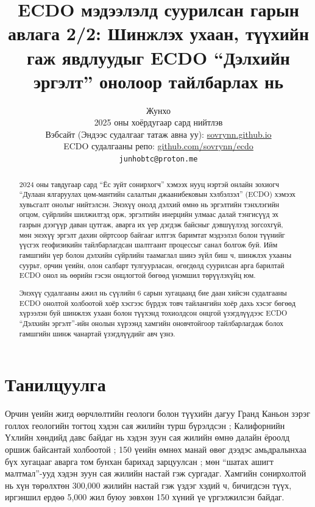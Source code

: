 \documentclass[10pt,twocolumn,letterpaper]{article}
\begin{document}
\title{ECDO мэдээлэлд суурилсан гарын авлага 2/2: Шинжлэх ухаан, түүхийн гаж явдлуудыг ECDO “Дэлхийн эргэлт” онолоор тайлбарлах нь}

\author{Жунхо\\
2025 оны хоёрдугаар сард нийтлэв\\
Вэбсайт (Эндээс судалгааг татаж авна уу): \href{https://sovrynn.github.io}{sovrynn.github.io}\\
ECDO судалгааны репо: \href{https://github.com/sovrynn/ecdo}{github.com/sovrynn/ecdo}\\
{\tt\small junhobtc@proton.me}
}

\maketitle

\begin{abstract}
2024 оны тавдугаар сард “Ёс зүйт сонирхогч” хэмээх нууц нэртэй онлайн зохиогч \cite{0} “Дулаан ялгаруулах цөм-мантийн салалтын джаанибековын хэлбэлзэл” (ECDO) \cite{1} хэмээх хувьсгалт онолыг нийтэлсэн. Энэхүү онолд дэлхий өмнө нь эргэлтийн тэнхлэгийн огцом, сүйрлийн шилжилтэд орж, эргэлтийн инерцийн улмаас далай тэнгисүүд эх газрын дээгүүр даван цутгаж, аварга их үер дэгдэж байсныг дэвшүүлээд зогсохгүй, мөн энэхүү эргэлт дахин ойртсоор байгааг илтгэх баримтат мэдээлэл болон түүнийг үүсгэх геофизикийн тайлбарлагдсан шалтгаант процессыг санал болгож буй. Ийм гамшгийн үер болон дэлхийн сүйрлийн таамаглал шинэ зүйл биш ч, шинжлэх ухааны суурьт, орчин үеийн, олон салбарт тулгуурласан, өгөгдөлд суурилсан арга барилтай ECDO онол нь өөрийн гэсэн онцлогтой бөгөөд үнэмшил төрүүлэхүйц юм.

Энэхүү судалгааны ажил нь сүүлийн 6 сарын хугацаанд бие даан хийсэн судалгааны \cite{2,20} ECDO онолтой холбоотой хоёр хэсгээс бүрдэх товч тайлангийн хоёр дахь хэсэг бөгөөд хүрээлэн буй шинжлэх ухаан болон түүхэнд тохиолдсон онцгой үзэгдлүүдээс ECDO “Дэлхийн эргэлт”-ийн онолын хүрээнд хамгийн оновчтойгоор тайлбарлагдаж болох гамшгийн шинж чанартай үзэгдлүүдийг авч үзнэ.

\end{abstract}

\section{Танилцуулга}

Орчин үеийн жигд өөрчлөлтийн геологи болон түүхийн дагуу Гранд Каньон зэрэг голлох геологийн тогтоц хэдэн сая жилийн турш бүрэлдсэн \cite{143}; Калифорнийн Үхлийн хөндийд давс байдаг нь хэдэн зуун сая жилийн өмнө далайн ёроолд оршиж байсантай холбоотой \cite{144}; 150 үеийн өмнөх манай өвөг дээдэс амьдралынхаа бүх хугацааг аварга том бунхан барихад зарцуулсан \cite{29,70}; мөн “шатах ашигт малтмал”-ууд хэдэн зуун сая жилийн настай \cite{104} гэж сургадаг. Хамгийн сонирхолтой нь хүн төрөлхтөн 300,000 жилийн настай гэж үздэг хэдий ч, бичигдсэн түүх, иргэншил ердөө 5,000 жил буюу зөвхөн 150 хүний үе үргэлжилсэн байдаг.
\end{document}
